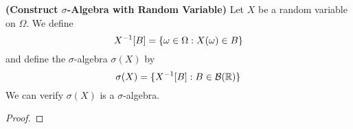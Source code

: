 \documentclass{report}
\begin{document}
\begin{theorem}
\textbf{(Construct  $\sigma$-Algebra with Random Variable)} Let $X$ be a random variable on  $\Omega$. We define
\begin{equation}
X^{-1}[B]=\{ \omega \in \Omega : X(\omega)\in B \}
\end{equation}
and define the $\sigma$-algebra $\sigma(X)$ by
\begin{equation}
\sigma(X)=\{ X^{-1}[B]:B\in\mathcal{B}(\mathbb{R}) \}
\end{equation}
We can verify $\sigma(X)$ is a $\sigma$-algebra.
\end{theorem}
\begin{proof}
\end{proof}
\end{document}
